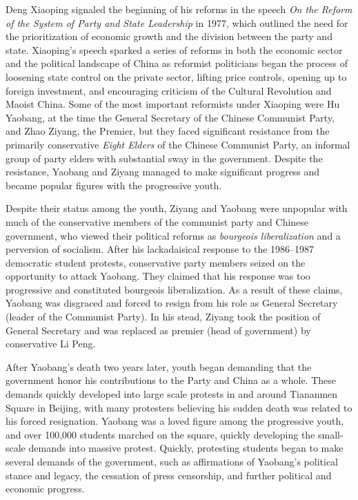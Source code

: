 \documentclass{paper}
\begin{document}
Deng Xiaoping signaled the beginning of his reforms in the speech \textit{On the Reform of the System of Party and State Leadership} in 1977, which outlined the need for the prioritization of economic growth and the division between the party and state.
Xiaoping's speech sparked a series of reforms in both the economic sector and the political landscape of China as reformist politicians began the process of loosening state control on the private sector, lifting price controls, opening up to foreign investment, and encouraging criticism of the Cultural Revolution and Maoist China.
Some of the most important reformists under Xiaoping were Hu Yaobang, at the time the General Secretary of the Chinese Communist Party, and Zhao Ziyang, the Premier, but they faced significant resistance from the primarily conservative \emph{Eight Elders} of the Chinese Communist Party, an informal group of party elders with substantial sway in the government.
Despite the resistance, Yaobang and Ziyang managed to make significant progress and became popular figures with the progressive youth.

Despite their status among the youth, Ziyang and Yaobang were unpopular with much of the conservative members of the communist party and Chinese government, who viewed their political reforms as \emph{bourgeois liberalization} and a perversion of socialism.
After his lackadaisical response to the 1986--1987 democratic student protests, conservative party members seized on the opportunity to attack Yaobang.
They claimed that his response was too progressive and constituted bourgeois liberalization.\autocite{deng}
As a result of these claims, Yaobang was disgraced and forced to resign from his role as General Secretary (leader of the Communist Party).\autocite{calhoun}
In his stead, Ziyang took the position of General Secretary and was replaced as premier (head of government) by conservative Li Peng.

After Yaobang's death two years later, youth began demanding that the government honor his contributions to the Party and China as a whole.
These demands quickly developed into large scale protests in and around Tiananmen Square in Beijing, with many protesters believing his sudden death was related to his forced resignation.\autocite{calhoun}
Yaobang was a loved figure among the progressive youth, and over 100,000 students marched on the square, quickly developing the small-scale demands into massive protest.
Quickly, protesting students began to make several demands of the government, such as affirmations of Yaobang's political stance and legacy, the cessation of press censorship, and further political and economic progress.
\end{document}
